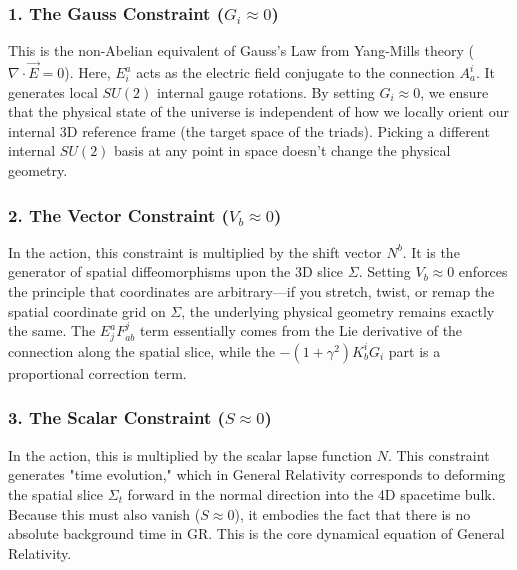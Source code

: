 \documentclass{article}
\begin{document}
\subsubsection{1. The Gauss Constraint ($G_i \approx 0$)}

This is the non-Abelian equivalent of Gauss's Law from Yang-Mills theory ($\nabla \cdot \vec{E} = 0$). Here, $E^a_i$ acts as the electric field conjugate to the connection $A_a^i$. It generates local $SU(2)$ internal gauge rotations. By setting $G_i \approx 0$, we ensure that the physical state of the universe is independent of how we locally orient our internal 3D reference frame (the target space of the triads). Picking a different internal $SU(2)$ basis at any point in space doesn't change the physical geometry.

\subsubsection{2. The Vector Constraint ($V_b \approx 0$)}

In the action, this constraint is multiplied by the shift vector $N^b$. It is the generator of spatial diffeomorphisms upon the 3D slice $\Sigma$. Setting $V_b \approx 0$ enforces the principle that coordinates are arbitrary—if you stretch, twist, or remap the spatial coordinate grid on $\Sigma$, the underlying physical geometry remains exactly the same. The $E^a_j F^j_{ab}$ term essentially comes from the Lie derivative of the connection along the spatial slice, while the $- (1+\gamma^2)K^i_b G_i$ part is a proportional correction term.

\subsubsection{3. The Scalar Constraint ($S \approx 0$)}

In the action, this is multiplied by the scalar lapse function $N$. This constraint generates "time evolution," which in General Relativity corresponds to deforming the spatial slice $\Sigma_t$ forward in the normal direction into the 4D spacetime bulk. Because this must also vanish ($S \approx 0$), it embodies the fact that there is no absolute background time in GR. This is the core dynamical equation of General Relativity.
\end{document}

